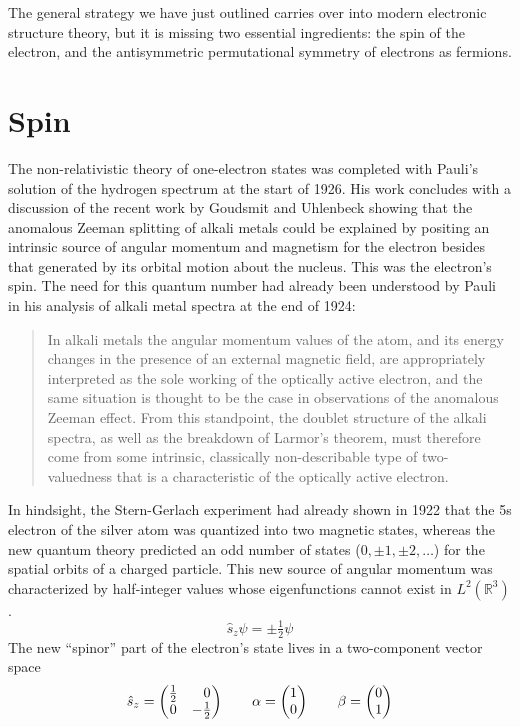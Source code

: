 The general strategy we have just outlined carries over into modern electronic
structure theory, but it is missing two essential ingredients: the spin of the
electron, and the antisymmetric permutational symmetry of electrons as fermions.


\section{Spin}

The non-relativistic theory of one-electron states was completed with Pauli's
solution of the hydrogen spectrum at the start of 1926.\cite{Pauli:1926p336}
His work concludes with a discussion of the recent work by Goudsmit and
Uhlenbeck\cite{Uhlenbeck:1925p953} showing that the anomalous Zeeman splitting
of alkali metals could be explained by positing an intrinsic source of angular
momentum and magnetism for the electron besides that generated by its orbital
motion about the nucleus.
This was the electron's spin.
The need for this quantum number had already been understood by Pauli in his
analysis of alkali metal spectra at the end of 1924:
\begin{quote}
    In alkali metals the angular momentum values of the atom, and its energy
    changes in the presence of an external magnetic field, are appropriately
    interpreted as the sole working of the optically active electron, and the
    same situation is thought to be the case in observations of the anomalous
    Zeeman effect.
    From this standpoint, the doublet structure of the alkali
    spectra, as well as the breakdown of Larmor's theorem, must
    therefore come from some intrinsic, classically non-describable
    type of two-valuedness that is a characteristic of the optically
    active electron.\cite{Pauli:1925p373}
\end{quote}
In hindsight, the Stern-Gerlach experiment\cite{Gerlach:1922p349} had already
shown in 1922 that the 5s electron of the silver atom was quantized into two
magnetic states, whereas the new quantum theory predicted an odd number of
states (\(0, \pm1, \pm2, \dots\)) for the spatial orbits of a charged particle.
This new source of angular momentum was characterized by half-integer values
whose eigenfunctions cannot exist in \(L^2(\mathbb{R}^3)\).
\begin{equation}
    \hat{s}_z
    \psi
    =
    \pm
    \tfrac{1}{2}
    \psi
\end{equation}
The new ``spinor'' part of the electron's state lives in a two-component vector
space
\begin{equation}
    \hat{s}_z
    =
    \begin{pmatrix}
        \tfrac{1}{2} & \hphantom{+}0 \\
        0 & -\tfrac{1}{2}
    \end{pmatrix}
    \qquad
    \alpha
    =
    \begin{pmatrix}
        1 \\ 0
    \end{pmatrix}
    \qquad
    \beta
    =
    \begin{pmatrix}
        0 \\ 1
    \end{pmatrix}
\end{equation}
